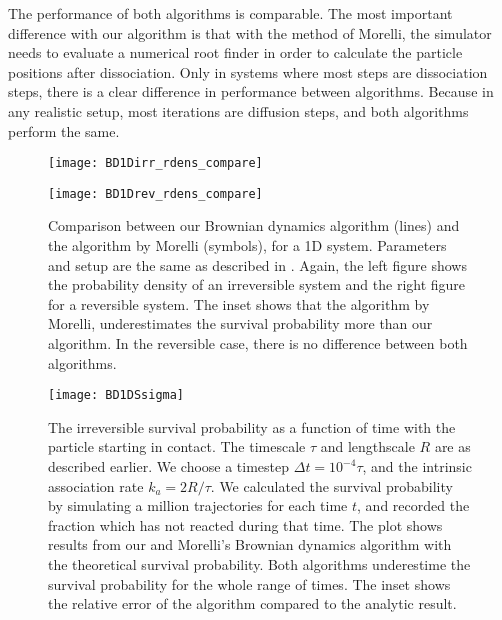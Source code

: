 The performance of both algorithms is comparable. The most important difference with our algorithm is that with the method of Morelli, the simulator needs to evaluate a numerical root finder in order to calculate the particle positions after dissociation. Only in systems where most steps are dissociation steps, there is a clear difference in performance between algorithms. Because in any realistic setup, most iterations are diffusion steps, and both algorithms perform the same.

\begin{figure}[hb]
\begin{minipage}[ht]{.5\linewidth}
\centering
\texttt{[image: BD1Dirr\_rdens\_compare]}
\end{minipage}
\begin{minipage}[ht]{.5\linewidth}
\centering
\texttt{[image: BD1Drev\_rdens\_compare]}
\end{minipage}
\caption{ Comparison between our Brownian dynamics algorithm (lines) and the algorithm by Morelli \cite{Morelli2008a} (symbols), for a 1D system. Parameters and setup are the same as described in . Again, the left figure shows the probability density of an irreversible system and the right figure for a reversible system. The inset shows that the algorithm by Morelli, underestimates the survival probability more than our algorithm. In the reversible case, there is no difference between both algorithms.}
\end{figure}

\begin{figure}[hb]
\centering
\texttt{[image: BD1DSsigma]}
\caption{ The irreversible survival probability as a function of time with the particle starting in contact. The timescale $\tau$ and lengthscale $R$ are as described earlier. We choose a timestep $\Delta t = 10^{-4} \tau$, and the intrinsic association rate $k_a=2 R/\tau$. We calculated the survival probability by simulating a million trajectories for each time $t$, and recorded the fraction which has not reacted during that time. The plot shows results from our and Morelli's Brownian dynamics algorithm with the theoretical survival probability. Both algorithms underestime the survival probability for the whole range of times. The inset shows the relative error of the algorithm compared to the analytic result.}
\end{figure}